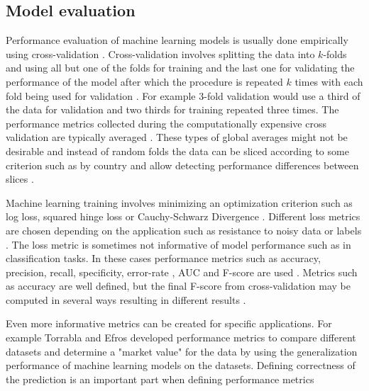 \subsection{Model evaluation}
\label{sec:mlperf}

Performance evaluation of machine learning models is usually done empirically using cross-validation \parencite{formanApplestoApplesCrossValidationStudies,sokolovaSystematicAnalysisPerformance2009}. Cross-validation involves splitting the data into $k$-folds and using all but one of the folds for training and the last one for validating the performance of the model after which the procedure is repeated $k$ times with each fold being used for validation \parencite{cawleyOverfittingModelSelection}. For example $3$-fold validation would use a third of the data for validation and two thirds for training repeated three times. The performance metrics collected during the computationally expensive cross validation are typically averaged \parencite{cawleyOverfittingModelSelection}. These types of global averages might not be desirable and instead of random folds the data can be sliced according to some criterion such as by country and allow detecting performance differences between slices \parencite{breckMLTestScore2017a}.

Machine learning training involves minimizing an optimization criterion such as log loss, squared hinge loss or Cauchy-Schwarz Divergence \parencite{janochaLossFunctionsDeep2017}. Different loss metrics are chosen depending on the application such as resistance to noisy data or labels \parencite{janochaLossFunctionsDeep2017}. The loss metric is sometimes not informative of model performance such as in classification tasks. In these cases performance metrics such as accuracy, precision, recall, specificity, error-rate , AUC and F-score are used \parencite{sokolovaSystematicAnalysisPerformance2009,formanApplestoApplesCrossValidationStudies}. Metrics such as accuracy are well defined, but the final F-score from cross-validation may be computed in several ways resulting in different results \parencite{formanApplestoApplesCrossValidationStudies}.

Even more informative metrics can be created for specific applications. For example Torrabla and Efros \parencite*{torralbaUnbiasedLookDataset2011} developed performance metrics to compare different datasets and determine a "market value" for the data by using the generalization performance of machine learning models on the datasets. Defining correctness of the prediction is an important part when defining performance metrics \parencite{linMicrosoftCOCOCommon2014}

